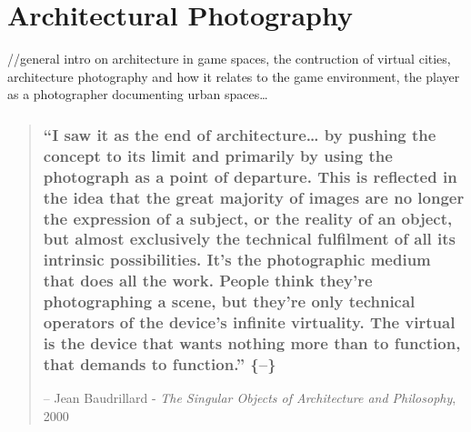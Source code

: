 \documentclass[
  openany]{book}
\begin{document}
\hypertarget{architectural-photography}{%
\chapter{Architectural Photography}\label{architectural-photography}}

//general intro on architecture in game spaces, the contruction of virtual cities, architecture photography and how it relates to the game environment, the player as a photographer documenting urban spaces\ldots{}

\begin{quote}
\hypertarget{i-saw-it-as-the-end-of-architecture-by-pushing-the-concept-to-its-limit-and-primarily-by-using-the-photograph-as-a-point-of-departure.-this-is-reflected-in-the-idea-that-the-great-majority-of-images-are-no-longer-the-expression-of-a-subject-or-the-reality-of-an-object-but-almost-exclusively-the-technical-fulfilment-of-all-its-intrinsic-possibilities.-its-the-photographic-medium-that-does-all-the-work.-people-think-theyre-photographing-a-scene-but-theyre-only-technical-operators-of-the-devices-infinite-virtuality.-the-virtual-is-the-device-that-wants-nothing-more-than-to-function-that-demands-to-function.}{%
\subsection{``I saw it as the end of architecture\ldots{} by pushing the concept to its limit and primarily by using the photograph as a point of departure. This is reflected in the idea that the great majority of images are no longer the expression of a subject, or the reality of an object, but almost exclusively the technical fulfilment of all its intrinsic possibilities. It's the photographic medium that does all the work. People think they're photographing a scene, but they're only technical operators of the device's infinite virtuality. The virtual is the device that wants nothing more than to function, that demands to function.'' \{--\}}\label{i-saw-it-as-the-end-of-architecture-by-pushing-the-concept-to-its-limit-and-primarily-by-using-the-photograph-as-a-point-of-departure.-this-is-reflected-in-the-idea-that-the-great-majority-of-images-are-no-longer-the-expression-of-a-subject-or-the-reality-of-an-object-but-almost-exclusively-the-technical-fulfilment-of-all-its-intrinsic-possibilities.-its-the-photographic-medium-that-does-all-the-work.-people-think-theyre-photographing-a-scene-but-theyre-only-technical-operators-of-the-devices-infinite-virtuality.-the-virtual-is-the-device-that-wants-nothing-more-than-to-function-that-demands-to-function.}}

-- Jean Baudrillard - \emph{The Singular Objects of Architecture and Philosophy}, 2000
\end{quote}
\end{document}
